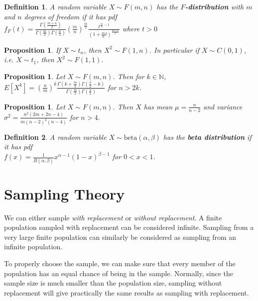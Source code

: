 \documentclass[12pt,twoside]{report}
\theoremstyle{thmstyle}
\newtheorem{defn}{Definition}
\newtheorem{prop}[subsection]{Proposition}
\begin{document}
\begin{defn}
    A random variable $X \sim F(m,n)$ has the \textbf{$F$-distribution} with $m$ and $n$ degrees of freedom if it has pdf \\ 
    $ f_F(t) = \displaystyle \frac{\Gamma\left(\frac{m + n}{2} \right)}{\Gamma\left(\frac{m}{2} \right) \Gamma\left(\frac{n}{2} \right)} \displaystyle \left(\frac{m}{n}\right)^{\frac{m}{2}} \frac{t^{\frac{m}{2} - 1}}{(1 + \frac{m}{n}t)^{\frac{m + n}{2}}} $ where $t > 0$
\end{defn}

\begin{prop}
    If $X \sim t_n$, then $X^2 \sim F(1,n)$. In particular if $X \sim C(0,1)$, i.e. $X \sim t_1$, then $X^2 \sim F(1,1)$.
\end{prop}

\begin{prop}
    Let $X \sim F(m,n)$. Then for $k \in \mathbb{N}$, $E[X^k] =\displaystyle \left(\frac{n}{m}\right)^k \frac{\Gamma(k + \frac{m}{2}) \Gamma(\frac{n}{2} - k)}{\Gamma(\frac{m}{2}) \Gamma(\frac{n}{2})}$ for $n > 2k$.
\end{prop}

\begin{prop}
    Let $X \sim F(m,n)$. Then $X$ has mean $\mu = \displaystyle \frac{n}{n-2}$ and variance $\sigma^2 = \displaystyle \frac{n^2 (2m + 2n - 4)}{m (n-2)^2 (n-4)}$ for $n > 4$.
\end{prop}

\begin{defn}
    A random variable $X \sim \text{beta}(\alpha, \beta)$ has the \textbf{beta distribution} if it has pdf \\
    $ f(x) = \displaystyle \frac{1}{B(\alpha, \beta)} x^{\alpha-1} (1-x)^{\beta - 1}$ for $0 < x < 1$.
\end{defn}

\section{Sampling Theory}
We can either sample \textit{with replacement} or \textit{without replacement}. A finite population sampled with replacement can be considered infinite. Sampling from a very large finite population can similarly be considered as sampling from an infinite population. 

To properly choose the sample, we can make sure that every member of the population has an equal chance of being in the sample.
Normally, since the sample size is much smaller than the population size, sampling without replacement will give practically the same results as sampling with replacement.
\end{document}
